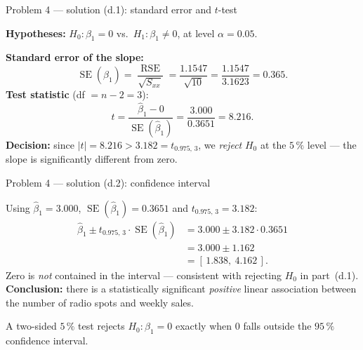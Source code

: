 \documentclass[aspectratio=169,11pt]{beamer}
\begin{document}
\begin{frame}{Problem 4 --- solution (d.1): standard error and $t$-test}
  \begin{solutionbox}
    \textbf{Hypotheses:} $H_0\colon\beta_1=0$ vs.\ $H_1\colon\beta_1\ne 0$, at level $\alpha=0.05$.
    \medskip

    \textbf{Standard error of the slope:}
    \[
      \operatorname{SE}(\hat\beta_1)=\frac{\operatorname{RSE}}{\sqrt{S_{xx}}}
      =\frac{1.1547}{\sqrt{10}}=\frac{1.1547}{3.1623}=0.365.
    \]
    \textbf{Test statistic} (df $=n-2=3$):
    \[
      t=\frac{\hat\beta_1-0}{\operatorname{SE}(\hat\beta_1)}=\frac{3.000}{0.3651}=8.216.
    \]
    \textbf{Decision:} since $|t|=8.216>3.182=t_{0.975,\,3}$, we \emph{reject} $H_0$ at the
    $5\,\%$ level --- the slope is significantly different from zero.
  \end{solutionbox}
\end{frame}

\begin{frame}{Problem 4 --- solution (d.2): confidence interval}
  \begin{solutionbox}
    Using $\hat\beta_1=3.000$, $\operatorname{SE}(\hat\beta_1)=0.3651$ and $t_{0.975,\,3}=3.182$:
    \begin{align*}
      \hat\beta_1 \pm t_{0.975,\,3}\cdot\operatorname{SE}(\hat\beta_1)
      &= 3.000 \pm 3.182\cdot 0.3651\\
      &= 3.000 \pm 1.162\\
      &= [\,1.838,\ 4.162\,].
    \end{align*}
    Zero is \emph{not} contained in the interval --- consistent with rejecting $H_0$ in
    part~(d.1). \textbf{Conclusion:} there is a statistically significant \emph{positive} linear
    association between the number of radio spots and weekly sales.
  \end{solutionbox}
  \begin{takeaway}
    A two-sided $5\,\%$ test rejects $H_0\colon\beta_1=0$ exactly when $0$ falls outside the
    $95\,\%$ confidence interval.
  \end{takeaway}
\end{frame}
\end{document}
